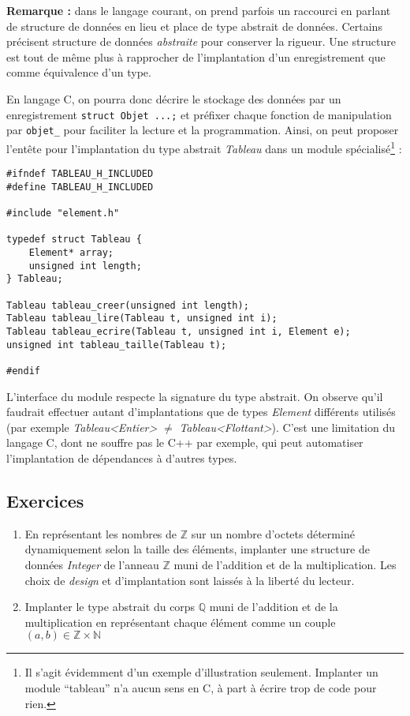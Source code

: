 \documentclass[../../../main.tex]{subfiles}
\begin{document}
\textbf{Remarque :} dans le langage courant, on prend parfois un raccourci en parlant de structure de données en lieu et place de type abstrait de données. Certains précisent structure de données \textit{abstraite} pour conserver la rigueur. Une structure est tout de même plus à rapprocher de l'implantation d'un enregistrement que comme équivalence d'un type.

En langage C, on pourra donc décrire le stockage des données par un enregistrement \texttt{struct Objet {...};} et préfixer chaque fonction de manipulation par \texttt{objet_} pour faciliter la lecture et la programmation. Ainsi, on peut proposer l'entête pour l'implantation du type abstrait \textit{Tableau} dans un module spécialisé\footnote{Il s'agit évidemment d'un exemple d'illustration seulement. Implanter un module ``tableau'' n'a aucun sens en C, à part à écrire trop de code pour rien.} :
\begin{verbatim}
#ifndef TABLEAU_H_INCLUDED
#define TABLEAU_H_INCLUDED

#include "element.h"

typedef struct Tableau {
	Element* array;
	unsigned int length;
} Tableau;

Tableau tableau_creer(unsigned int length);
Tableau tableau_lire(Tableau t, unsigned int i);
Tableau tableau_ecrire(Tableau t, unsigned int i, Element e);
unsigned int tableau_taille(Tableau t);

#endif
\end{verbatim}
L'interface du module respecte la signature du type abstrait. On observe qu'il faudrait effectuer autant d'implantations que de types \textit{Element} différents utilisés (par exemple \textit{Tableau\textless Entier\textgreater} $\neq$ \textit{Tableau\textless Flottant\textgreater}). C'est une limitation du langage C, dont ne souffre pas le C++ par exemple, qui peut automatiser l'implantation de dépendances à d'autres types.
\subsection{Exercices}
\begin{enumerate}
	\item En représentant les nombres de $\mathbb{Z}$ sur un nombre d'octets déterminé dynamiquement selon la taille des éléments, implanter une structure de données \textit{Integer} de l'anneau $\mathbb{Z}$ muni de l'addition et de la multiplication. Les choix de \textit{design} et d'implantation sont laissés à la liberté du lecteur.
	\item Implanter le type abstrait du corps $\mathbb{Q}$ muni de l'addition et de la multiplication en représentant chaque élément comme un couple $(a, b)\in\mathbb{Z}\times{\mathbb{N}}$
\end{enumerate}
\end{document}
